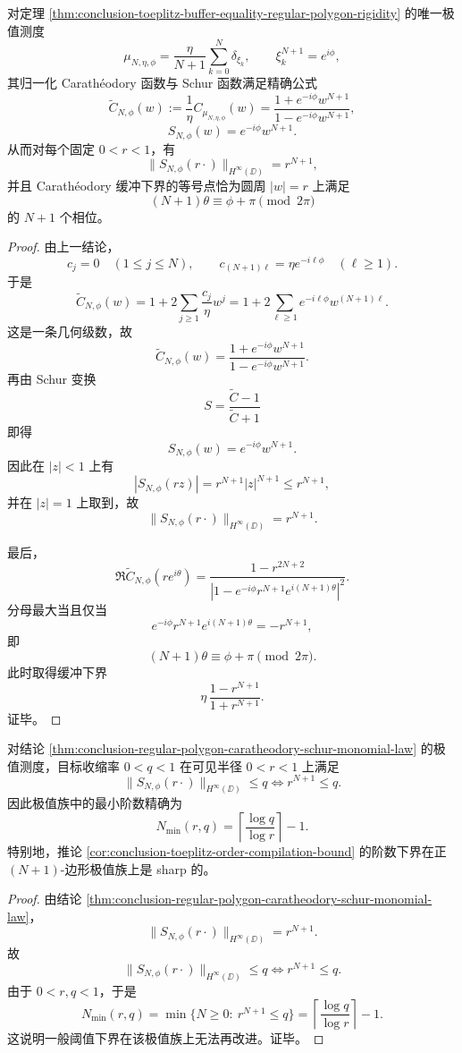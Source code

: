 \begin{theorem}\label{thm:conclusion-regular-polygon-caratheodory-schur-monomial-law}
对定理 \ref{thm:conclusion-toeplitz-buffer-equality-regular-polygon-rigidity} 的唯一极值测度
\[
\mu_{N,\eta,\phi}=\frac{\eta}{N+1}\sum_{k=0}^{N}\delta_{\xi_k},
\qquad
\xi_k^{N+1}=e^{i\phi},
\]
其归一化 Carath\'eodory 函数与 Schur 函数满足精确公式
\[
\widetilde C_{N,\phi}(w):=\frac{1}{\eta}C_{\mu_{N,\eta,\phi}}(w)
=
\frac{1+e^{-i\phi}w^{N+1}}{1-e^{-i\phi}w^{N+1}},
\]
\[
S_{N,\phi}(w)=e^{-i\phi}w^{N+1}.
\]
从而对每个固定 \(0<r<1\)，有
\[
\|S_{N,\phi}(r\cdot)\|_{H^\infty(\DD)}=r^{N+1},
\]
并且 Carath\'eodory 缓冲下界的等号点恰为圆周 \(|w|=r\) 上满足
\[
(N+1)\theta\equiv \phi+\pi \pmod{2\pi}
\]
的 \(N+1\) 个相位。
\end{theorem}
\begin{proof}
由上一结论，
\[
c_j=0\quad(1\le j\le N),
\qquad
c_{(N+1)\ell}=\eta e^{-i\ell\phi}\quad(\ell\ge 1).
\]
于是
\[
\widetilde C_{N,\phi}(w)
=
1+2\sum_{j\ge 1}\frac{c_j}{\eta}w^j
=
1+2\sum_{\ell\ge 1}e^{-i\ell\phi}w^{(N+1)\ell}.
\]
这是一条几何级数，故
\[
\widetilde C_{N,\phi}(w)
=
\frac{1+e^{-i\phi}w^{N+1}}{1-e^{-i\phi}w^{N+1}}.
\]
再由 Schur 变换
\[
S=\frac{\widetilde C-1}{\widetilde C+1}
\]
即得
\[
S_{N,\phi}(w)=e^{-i\phi}w^{N+1}.
\]
因此在 \(|z|<1\) 上有
\[
|S_{N,\phi}(rz)|=r^{N+1}|z|^{N+1}\le r^{N+1},
\]
并在 \(|z|=1\) 上取到，故
\[
\|S_{N,\phi}(r\cdot)\|_{H^\infty(\DD)}=r^{N+1}.
\]

最后，
\[
\Re \widetilde C_{N,\phi}(re^{i\theta})
=
\frac{1-r^{2N+2}}{|1-e^{-i\phi}r^{N+1}e^{i(N+1)\theta}|^2}.
\]
分母最大当且仅当
\[
e^{-i\phi}r^{N+1}e^{i(N+1)\theta}=-r^{N+1},
\]
即
\[
(N+1)\theta\equiv \phi+\pi \pmod{2\pi}.
\]
此时取得缓冲下界
\[
\eta\,\frac{1-r^{N+1}}{1+r^{N+1}}.
\]
证毕。
\end{proof}

\begin{theorem}\label{thm:conclusion-toeplitz-margin-sharp-threshold-law}
对结论 \ref{thm:conclusion-regular-polygon-caratheodory-schur-monomial-law} 的极值测度，目标收缩率 \(0<q<1\) 在可见半径 \(0<r<1\) 上满足
\[
\|S_{N,\phi}(r\cdot)\|_{H^\infty(\DD)}\le q
\iff
r^{N+1}\le q.
\]
因此极值族中的最小阶数精确为
\[
N_{\min}(r,q)=\left\lceil \frac{\log q}{\log r}\right\rceil-1.
\]
特别地，推论 \ref{cor:conclusion-toeplitz-order-compilation-bound} 的阶数下界在正 \((N+1)\)-边形极值族上是 sharp 的。
\end{theorem}
\begin{proof}
由结论 \ref{thm:conclusion-regular-polygon-caratheodory-schur-monomial-law}，
\[
\|S_{N,\phi}(r\cdot)\|_{H^\infty(\DD)}=r^{N+1}.
\]
故
\[
\|S_{N,\phi}(r\cdot)\|_{H^\infty(\DD)}\le q
\iff
r^{N+1}\le q.
\]
由于 \(0<r,q<1\)，于是
\[
N_{\min}(r,q)
=
\min\{N\ge 0:\ r^{N+1}\le q\}
=
\left\lceil \frac{\log q}{\log r}\right\rceil-1.
\]
这说明一般阈值下界在该极值族上无法再改进。证毕。
\end{proof}

